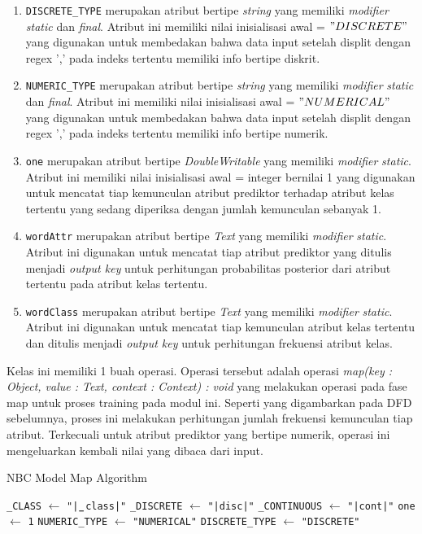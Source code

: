 \begin{enumerate}
\begin{enumerate}
		\item \verb|DISCRETE_TYPE| merupakan atribut bertipe \textit{string} yang memiliki \textit{modifier} \textit{static} dan \textit{final}. Atribut ini memiliki nilai inisialisasi awal = $"DISCRETE"$ yang digunakan untuk membedakan bahwa data input setelah displit dengan regex ',' pada indeks tertentu memiliki info bertipe diskrit.
		\item \verb|NUMERIC_TYPE| merupakan atribut bertipe \textit{string} yang memiliki \textit{modifier} \textit{static} dan \textit{final}. Atribut ini memiliki nilai inisialisasi awal = $"NUMERICAL"$ yang digunakan untuk membedakan bahwa data input setelah displit dengan regex ',' pada indeks tertentu memiliki info bertipe numerik.
		\item \verb|one| merupakan atribut bertipe \textit{DoubleWritable} yang memiliki \textit{modifier} \textit{static}. Atribut ini memiliki nilai inisialisasi awal = integer bernilai 1 yang digunakan untuk mencatat tiap kemunculan atribut prediktor terhadap atribut kelas tertentu yang sedang diperiksa dengan jumlah kemunculan sebanyak 1.
		\item \verb|wordAttr| merupakan atribut bertipe \textit{Text} yang memiliki \textit{modifier} \textit{static}. Atribut ini digunakan untuk mencatat tiap atribut prediktor yang ditulis menjadi \textit{output key} untuk perhitungan probabilitas posterior dari atribut tertentu pada atribut kelas tertentu.
		\item \verb|wordClass| merupakan atribut bertipe \textit{Text} yang memiliki \textit{modifier} \textit{static}. Atribut ini digunakan untuk mencatat tiap kemunculan atribut kelas tertentu dan ditulis menjadi \textit{output key} untuk perhitungan frekuensi atribut kelas.
	\end{enumerate}
	Kelas ini memiliki 1 buah operasi. Operasi tersebut adalah operasi \textit{map(key : Object, value : Text, context : Context) : void} yang melakukan operasi pada fase map untuk proses training pada modul ini. Seperti yang digambarkan pada DFD sebelumnya, proses ini melakukan perhitungan jumlah frekuensi kemunculan tiap atribut. Terkecuali untuk atribut prediktor yang bertipe numerik, operasi ini mengeluarkan kembali nilai yang dibaca dari input.
	
\begin{algorithm}[H]
\caption{NBC Model Map Algorithm}\label{alg:NBCGenMap}
\begin{algorithmic}[1]
\State \verb|_|\texttt{CLASS} $\gets$ \texttt{"|}$\verb|_|$\texttt{class|"}
\State \verb|_|\texttt{DISCRETE} $\gets$ \texttt{"|disc|"}
\State \verb|_|\texttt{CONTINUOUS} $\gets$ \texttt{"|cont|"}
\State \texttt{one} $\gets$ \texttt{1}
\State \texttt{NUMERIC}\verb|_|\texttt{TYPE} $\gets$ \texttt{"NUMERICAL"}
\State \texttt{DISCRETE}\verb|_|\texttt{TYPE} $\gets$ \texttt{"DISCRETE"}


\end{algorithmic}
\end{algorithm}
\end{enumerate}

